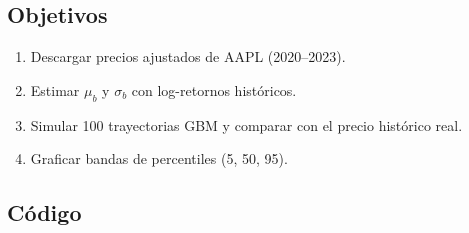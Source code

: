 \documentclass[12pt,letterpaper]{article}
\begin{document}
\subsection{Objetivos}
\begin{enumerate}
  \item Descargar precios ajustados de AAPL (2020--2023).
  \item Estimar $\mu_b$ y $\sigma_b$ con log-retornos hist\'oricos.
  \item Simular 100 trayectorias GBM y comparar con el precio hist\'orico real.
  \item Graficar bandas de percentiles (5\textdegree, 50\textdegree, 95\textdegree).
\end{enumerate}

\subsection{C\'odigo}
\end{document}
